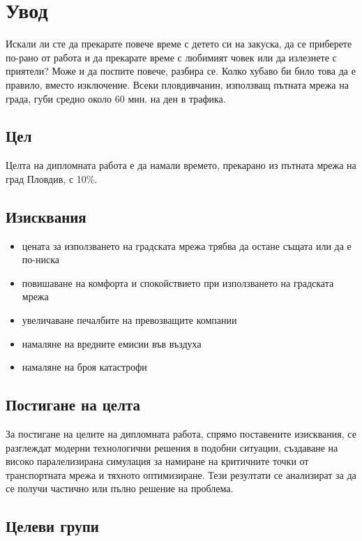 \chapter{Увод}

Искали ли сте да прекарате повече време с детето си на закуска, да се приберете по-рано от работа и да прекарате време с любимият човек или да излезнете с приятели? Може и да поспите повече, разбира се. Колко хубаво би било това да е правило, вместо изключение.
Всеки пловдивчанин, използващ пътната мрежа на града, губи средно около 60 мин. на ден в трафика. 

\section{Цел}

Целта на дипломната работа е да намали времето, прекарано из пътната мрежа на град Пловдив, с 10\%. 

\section{Изисквания}

\begin{itemize}
\item цената за използването на градската мрежа трябва да остане същата или да е по-ниска
\item повишаване на комфорта и спокойствието при използването на градската мрежа
\item увеличаване печалбите на превозващите компании
\item намаляне на вредните емисии във въздуха
\item намаляне на броя катастрофи
\end{itemize}

\section{Постигане на целта}

За постигане на целите на дипломната работа, спрямо поставените изисквания, се разглеждат модерни технологични решения в подобни ситуации, създаване на високо паралелизирана симулация за намиране на критичните точки от транспортната мрежа и тяхното оптимизиране. Тези резултати се анализират за да се получи частично или пълно решение на проблема.

\section{Целеви групи}

